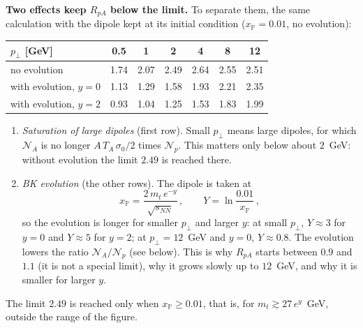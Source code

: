\documentclass[12pt]{article}
\newcommand{\xpo}{x_{\mathbb{P}}}
\begin{document}
\textbf{Two effects keep $R_{pA}$ below the limit.} To separate them, the same calculation with the
dipole kept at its initial condition ($\xpo=0.01$, no evolution):
\begin{center}
\begin{tabular}{lcccccc}
\toprule
$p_\perp$ [GeV] & 0.5 & 1 & 2 & 4 & 8 & 12 \\
\midrule
no evolution       & 1.74 & 2.07 & 2.49 & 2.64 & 2.55 & 2.51 \\
with evolution, $y=0$ & 1.13 & 1.29 & 1.58 & 1.93 & 2.21 & 2.35 \\
with evolution, $y=2$ & 0.93 & 1.04 & 1.25 & 1.53 & 1.83 & 1.99 \\
\bottomrule
\end{tabular}
\end{center}
\begin{enumerate}
\item \emph{Saturation of large dipoles} (first row). Small $p_\perp$ means large dipoles, for which
$\mathcal{N}_A$ is no longer $A\,T_A\,\sigma_0/2$ times $\mathcal{N}_p$. This matters only below about
$2$~GeV: without evolution the limit $2.49$ is reached there.
\item \emph{BK evolution} (the other rows). The dipole is taken at
\[
  \xpo=\frac{2\,m_t\,e^{-y}}{\sqrt{s_{NN}}}\,,\qquad Y=\ln\frac{0.01}{\xpo}\,,
\]
so the evolution is longer for smaller $p_\perp$ and larger $y$: at small $p_\perp$, $Y\approx3$ for
$y=0$ and $Y\approx5$ for $y=2$; at $p_\perp=12$~GeV and $y=0$, $Y\approx0.8$. The evolution
lowers the ratio $\mathcal{N}_A/\mathcal{N}_p$ (see below). This is why $R_{pA}$ starts between $0.9$ and
$1.1$ (it is not a special limit), why it grows slowly up to $12$~GeV, and why it is smaller for larger $y$.
\end{enumerate}
The limit $2.49$ is reached only when $\xpo\geq0.01$, that is, for $m_t\gtrsim27\,e^{y}$~GeV, outside
the range of the figure.
\end{document}
